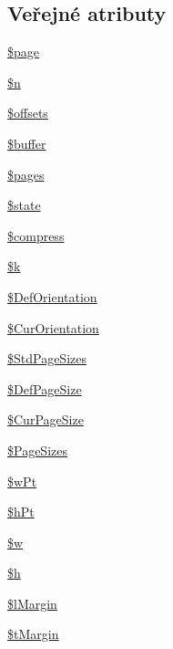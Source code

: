 \subsection*{Veřejné atributy}
\begin{DoxyCompactItemize}
\item 
\hyperlink{class_f_p_d_f_ab36ea1d04d26856c68ed3021b56eec5b}{\$page}
\item 
\hyperlink{class_f_p_d_f_a718a78c2c592d0a027429947df12d161}{\$n}
\item 
\hyperlink{class_f_p_d_f_a15347dda89239d5fa79ead40a72e0e34}{\$offsets}
\item 
\hyperlink{class_f_p_d_f_aa5e639d922350949dc1a58a4597c58bb}{\$buffer}
\item 
\hyperlink{class_f_p_d_f_a43708e8b1a7d9c88f08982c4473d7767}{\$pages}
\item 
\hyperlink{class_f_p_d_f_a8aef065fb2791fd919608521a801b7d3}{\$state}
\item 
\hyperlink{class_f_p_d_f_a6effca6f281458983c61647878f6dc18}{\$compress}
\item 
\hyperlink{class_f_p_d_f_adadc589358125e9865dc6565722b7a08}{\$k}
\item 
\hyperlink{class_f_p_d_f_ad1640384fda9ee53cf7295eb823a31dc}{\$\-Def\-Orientation}
\item 
\hyperlink{class_f_p_d_f_a40250e931a9dd32601bbe2a5a1eaf492}{\$\-Cur\-Orientation}
\item 
\hyperlink{class_f_p_d_f_a8cfbaabd6e5ec70a7d074323f2295a41}{\$\-Std\-Page\-Sizes}
\item 
\hyperlink{class_f_p_d_f_a25da1996ae79613866cd98df244b43ba}{\$\-Def\-Page\-Size}
\item 
\hyperlink{class_f_p_d_f_a1d6aba267d684bb14898c66ab6ecc292}{\$\-Cur\-Page\-Size}
\item 
\hyperlink{class_f_p_d_f_ad5c52368f21457ca93d7f557a1cf5705}{\$\-Page\-Sizes}
\item 
\hyperlink{class_f_p_d_f_a7b22f93934a55c4d60d730ae69d94b6c}{\$w\-Pt}
\item 
\hyperlink{class_f_p_d_f_ac49ef47de69b357309f22c19231863e8}{\$h\-Pt}
\item 
\hyperlink{class_f_p_d_f_adcb78dac68c4b261fab2a9c03de77177}{\$w}
\item 
\hyperlink{class_f_p_d_f_a6bb420fc8cb8cf3d2218bb9148394999}{\$h}
\item 
\hyperlink{class_f_p_d_f_a52016e769b24e87eae66b3f3a7e9eb97}{\$l\-Margin}
\item 
\hyperlink{class_f_p_d_f_a89d24fb15623f31293ef11860ec53a77}{\$t\-Margin}

\end{DoxyCompactItemize}
